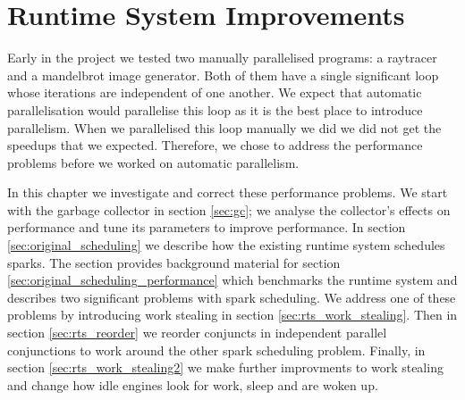 
\chapter{Runtime System Improvements}
\label{chap:rts}


Early in the project
we tested two manually parallelised programs:
a raytracer and a mandelbrot image generator.
Both of them have a single significant loop
whose iterations are independent of one another.
We expect that automatic parallelisation would parallelise this loop
as it is the best place to introduce parallelism.
When we parallelised this loop manually we did
we did not get the speedups that we expected.
Therefore,
we chose to address the performance problems
before we worked on automatic parallelism.

In this chapter we investigate and correct these performance problems.
We start with the garbage collector in section \ref{sec:gc};
we analyse the collector's effects on performance and tune its parameters
to improve performance.
In section \ref{sec:original_scheduling} we describe how the existing runtime
system schedules sparks.
The section provides background material for section
\ref{sec:original_scheduling_performance}
which benchmarks the runtime system and describes two significant problems with
spark scheduling.
We address one of these problems by introducing work stealing in section
\ref{sec:rts_work_stealing}.
Then in section \ref{sec:rts_reorder} we reorder conjuncts in independent
parallel conjunctions to work around the other spark scheduling problem.
Finally, in section \ref{sec:rts_work_stealing2} we make further improvments to
work stealing and change how idle engines look for work, sleep and are
woken up.






%


%


